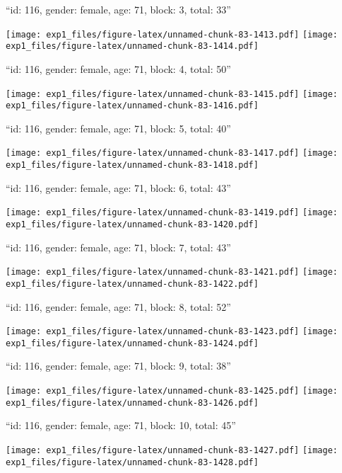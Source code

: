 \documentclass[11pt,,]{article}
\begin{document}
\newpage
[1] 

``id: 116, gender: female, age: 71, block: 3, total: 33''

\texttt{[image: exp1\_files/figure-latex/unnamed-chunk-83-1413.pdf]}
\texttt{[image: exp1\_files/figure-latex/unnamed-chunk-83-1414.pdf]}

\newpage
[1] 

``id: 116, gender: female, age: 71, block: 4, total: 50''

\texttt{[image: exp1\_files/figure-latex/unnamed-chunk-83-1415.pdf]}
\texttt{[image: exp1\_files/figure-latex/unnamed-chunk-83-1416.pdf]}

\newpage
[1] 

``id: 116, gender: female, age: 71, block: 5, total: 40''

\texttt{[image: exp1\_files/figure-latex/unnamed-chunk-83-1417.pdf]}
\texttt{[image: exp1\_files/figure-latex/unnamed-chunk-83-1418.pdf]}

\newpage
[1] 

``id: 116, gender: female, age: 71, block: 6, total: 43''

\texttt{[image: exp1\_files/figure-latex/unnamed-chunk-83-1419.pdf]}
\texttt{[image: exp1\_files/figure-latex/unnamed-chunk-83-1420.pdf]}

\newpage
[1] 

``id: 116, gender: female, age: 71, block: 7, total: 43''

\texttt{[image: exp1\_files/figure-latex/unnamed-chunk-83-1421.pdf]}
\texttt{[image: exp1\_files/figure-latex/unnamed-chunk-83-1422.pdf]}

\newpage
[1] 

``id: 116, gender: female, age: 71, block: 8, total: 52''

\texttt{[image: exp1\_files/figure-latex/unnamed-chunk-83-1423.pdf]}
\texttt{[image: exp1\_files/figure-latex/unnamed-chunk-83-1424.pdf]}

\newpage
[1] 

``id: 116, gender: female, age: 71, block: 9, total: 38''

\texttt{[image: exp1\_files/figure-latex/unnamed-chunk-83-1425.pdf]}
\texttt{[image: exp1\_files/figure-latex/unnamed-chunk-83-1426.pdf]}

\newpage
[1] 

``id: 116, gender: female, age: 71, block: 10, total: 45''

\texttt{[image: exp1\_files/figure-latex/unnamed-chunk-83-1427.pdf]}
\texttt{[image: exp1\_files/figure-latex/unnamed-chunk-83-1428.pdf]}
\end{document}
